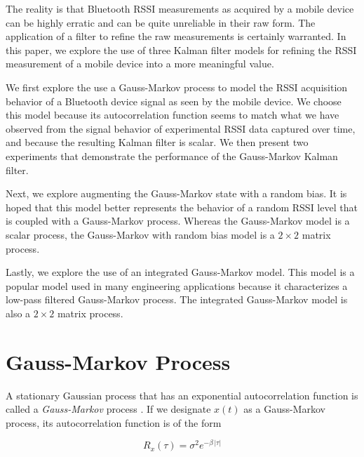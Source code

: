 \documentclass[12pt]{article}
\begin{document}
The reality is that Bluetooth RSSI measurements as acquired by a mobile device can be
highly erratic and can be quite unreliable in their raw form. The application of a filter
to refine the raw measurements is certainly warranted. In this paper, we explore the use
of three Kalman filter models for refining the RSSI measurement of a mobile device into
a more meaningful value.

We first explore the use a Gauss-Markov process to model the RSSI acquisition behavior of
a Bluetooth device signal as seen by the mobile device. We choose this model because its
autocorrelation function seems to match what we have observed from the signal behavior of
experimental RSSI data captured over time, and because the resulting Kalman filter is
scalar. We then present two experiments that demonstrate the performance of the
Gauss-Markov Kalman filter.

Next, we explore augmenting the Gauss-Markov state with a random bias. It is hoped that
this model better represents the behavior of a random RSSI level that is coupled with
a Gauss-Markov process. Whereas the Gauss-Markov model is a scalar process, the Gauss-Markov
with random bias model is a $2 \times 2$ matrix process.

Lastly, we explore the use of an integrated Gauss-Markov model. This model is a popular
model used in many engineering applications because it characterizes a low-pass filtered
Gauss-Markov process. The integrated Gauss-Markov model is also a $2 \times 2$ matrix
process.



%
%

\clearpage
\section{Gauss-Markov Process}

A stationary Gaussian process that has an exponential autocorrelation function is called
a \emph{Gauss-Markov} process \cite{rgbrown1983}. If we designate $x(t)$ as a Gauss-Markov
process, its autocorrelation function is of the form

\begin{equation}
    R_x(\tau) = \sigma^2 e^{-\beta \, \lvert \tau \rvert}
    \label{eq:GM-autocorrelation}
\end{equation}
\end{document}
